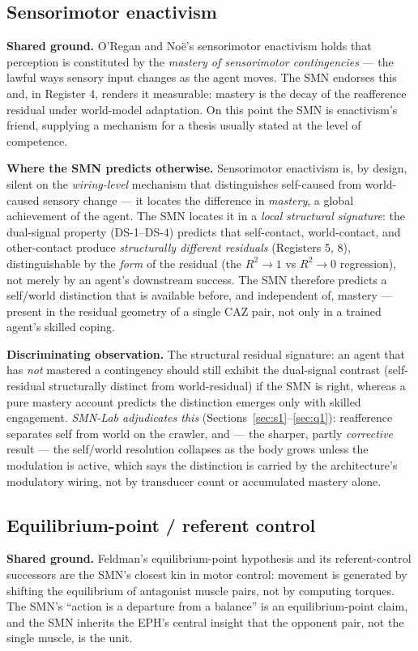 \documentclass[utf8]{FrontiersinHarvard} %
\begin{document}
\subsection{Sensorimotor enactivism}\label{sec:enact}
\textbf{Shared ground.} O'Regan and No\"e's sensorimotor enactivism \citep{OReganNoe2001Sensorimotor} holds that perception is constituted by the \emph{mastery of sensorimotor contingencies} --- the lawful ways sensory input changes as the agent moves. The SMN endorses this and, in Register 4, renders it measurable: mastery is the decay of the reafference residual under world-model adaptation. On this point the SMN is enactivism's friend, supplying a mechanism for a thesis usually stated at the level of competence.

\textbf{Where the SMN predicts otherwise.} Sensorimotor enactivism is, by design, silent on the \emph{wiring-level} mechanism that distinguishes self-caused from world-caused sensory change --- it locates the difference in \emph{mastery}, a global achievement of the agent. The SMN locates it in a \emph{local structural signature}: the dual-signal property (DS-1--DS-4) predicts that self-contact, world-contact, and other-contact produce \emph{structurally different residuals} (Registers 5, 8), distinguishable by the \emph{form} of the residual (the $R^2\to1$ vs $R^2\to0$ regression), not merely by an agent's downstream success. The SMN therefore predicts a self/world distinction that is available before, and independent of, mastery --- present in the residual geometry of a single CAZ pair, not only in a trained agent's skilled coping.

\textbf{Discriminating observation.} The structural residual signature: an agent that has \emph{not} mastered a contingency should still exhibit the dual-signal contrast (self-residual structurally distinct from world-residual) if the SMN is right, whereas a pure mastery account predicts the distinction emerges only with skilled engagement. \emph{SMN-Lab adjudicates this} (Sections~\ref{sec:s1}--\ref{sec:q1}): reafference separates self from world on the crawler, and --- the sharper, partly \emph{corrective} result --- the self/world resolution collapses as the body grows unless the modulation is active, which says the distinction is carried by the architecture's modulatory wiring, not by transducer count or accumulated mastery alone.

\subsection{Equilibrium-point / referent control}\label{sec:eph}
\textbf{Shared ground.} Feldman's equilibrium-point hypothesis and its referent-control successors \citep{Feldman1986_EquilibriumPoint,Feldman2015ReferentControl,Latash2008EquilibriumPointHistory} are the SMN's closest kin in motor control: movement is generated by shifting the equilibrium of antagonist muscle pairs, not by computing torques. The SMN's ``action is a departure from a balance'' is an equilibrium-point claim, and the SMN inherits the EPH's central insight that the opponent pair, not the single muscle, is the unit.
\end{document}
